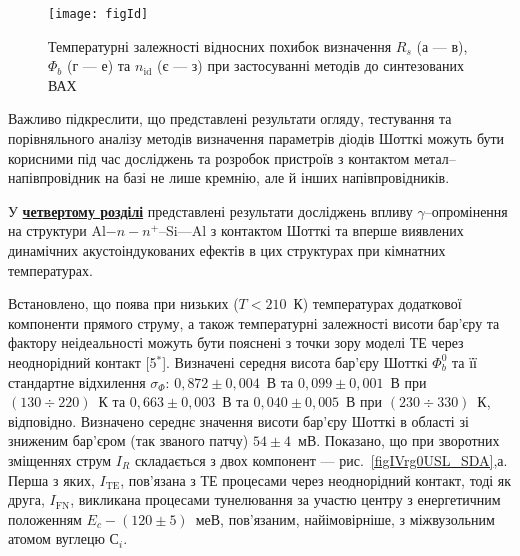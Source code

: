 \begin{figure}
\center
\texttt{[image: figId]}%
\caption{\label{figId}
Температурні залежності відносних похибок визначення $R_s$ (а --- в), $\Phi_b$ (г --- е) та $n_\mathrm{id}$ (є --- з) при застосуванні методів до синтезованих ВАХ
}
\end{figure}




Важливо підкреслити, що представлені результати огляду, тестування та порівняльного аналізу методів визначення параметрів діодів Шотткі можуть бути корисними під час досліджень та розробок пристроїв з контактом метал--напівпровідник на базі не лише кремнію, але й інших напівпровідників.


У  \underline{\textbf{четвертому розділі}} представлені результати досліджень
впливу $\gamma$--опромінення на структури Al$-n-n^+$--Si---Al з контактом Шотткі та
вперше виявлених динамічних акустоіндукованих ефектів в цих структурах при кімнатних температурах.

Встановлено, що поява при низьких ($T<210$~К) температурах додаткової компоненти прямого струму,
а також температурні залежності висоти бар'єру та фактору неідеальності можуть бути пояснені
з точки зору моделі ТЕ через неоднорідний контакт
[5$^*$].
%
       Визначені середня висота бар'єру Шотткі $\Phi_b^0$ та її стандартне відхилення $\sigma_{\Phi}$:
       $0,872\pm0,004$~В та $0,099\pm0,001$~В при $(130\div220)$~К та
       $0,663\pm0,003$~В та $0,040\pm0,005$~В при $(230\div330)$~К, відповідно.
Визначено середнє значення висоти бар'єру Шотткі в області зі зниженим бар'єром (так званого патчу) $54\pm4$~мВ.
Показано, що при зворотних зміщеннях струм $I_R$ складається з двох компонент --- рис.~\ref{figIVrg0USL_SDA},а.
Перша з яких, $I_\mathrm{TE}$, пов'язана з ТЕ процесами через неоднорідний контакт,
тоді як друга,
$I_\mathrm{FN}$, викликана процесами тунелювання за участю
центру з енергетичним положенням $E_c-(120\pm5)$~меВ, пов'язаним, найімовірніше, з міжвузольним атомом вуглецю С$_i$.

